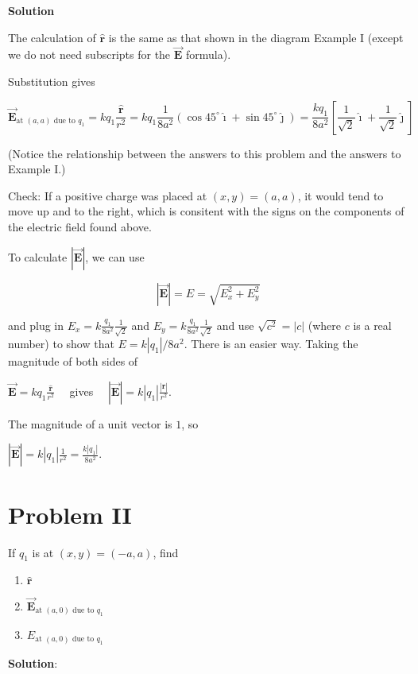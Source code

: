 \documentclass{article}
\newcommand{\ds}[0]{\displaystyle}
\newcommand{\ihat}[0]{\hat{\boldsymbol{\imath}}}
\newcommand{\jhat}[0]{\hat{\boldsymbol{\jmath}}}
\newcommand{\rhat}[0]{\hat{\mathbf{r}}}
\newcommand{\bfvec}[1]{\vec{\mathbf{#1}}}
\begin{document}
\textbf{Solution}

The calculation of $\rhat$ is the same as that shown in the diagram Example I (except we do not need subscripts for the $\bfvec{E}$ formula).

Substitution gives

$$\bfvec{E}_{\text{at }(a,a)\text{ due to }q_1}=kq_1\frac{\rhat}{r^2} = kq_1\frac{1}{8a^2}(\cos 45^\circ \ihat + \sin 45^\circ \jhat) =\frac{kq_1}{8a^2}\left[\frac{1}{\sqrt{2}}\ihat + \frac{1}{\sqrt{2}}\jhat\right]$$

(Notice the relationship between the answers to this problem and the answers to Example I.)

Check: If a positive charge was placed at $(x,y)=(a,a)$, it would tend to move up and to the right, which is consitent with the signs on the components of the electric field found above.

To calculate $|\bfvec{E}|$, we can use

$$|\bfvec{E}|=E=\sqrt{E_x^2+E_y^2}$$

and plug in $E_x=k\frac{q_1}{8a^2}\frac{1}{\sqrt{2}}$ and $E_y=k\frac{q_1}{8a^2}\frac{1}{\sqrt{2}}$ and use $\sqrt{c^2}=|c|$ (where $c$ is a real number) to show that $E=k|q_1|/{8a^2}$. There is an easier way. Taking the magnitude of both sides of

$\ds\bfvec{E}=kq_1\frac{\rhat}{r^2}\quad$
gives
$\quad\ds|\bfvec{E}|=k|q_1|\frac{|\rhat|}{r^2}$.

The magnitude of a unit vector is $1$, so

$\ds|\bfvec{E}|=k|q_1|\frac{1}{r^2}=\frac{k|q_1|}{8a^2}$.

\newpage

\section{Problem II}

If $q_1$ is at $(x,y)=(-a,a)$, find 

\begin{enumerate}

  \item $\rhat$

  \item $\bfvec{E}_{\text{at }(a,0)\text{ due to }q_1}$

  \item $E_{\text{at }(a,0)\text{ due to }q_1}$

\end{enumerate}

\ifsolutions
{\bf Solution}:
\end{document}

